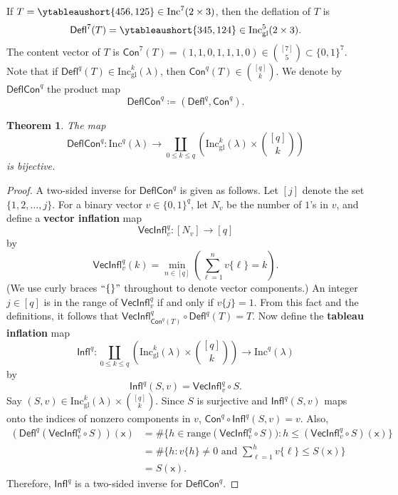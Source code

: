 \documentclass[12pt]{amsart}
\newcommand{\x}{\ensuremath{\mathsf{x}}}
\newtheorem{theorem}{Theorem}[section]
\theoremstyle{definition}
\newenvironment{example}
  {\pushQED{\qed}\renewcommand{\qedsymbol}{$\diamondsuit$}\examplex}
  {\popQED\endexamplex}
\theoremstyle{remark}
\numberwithin{equation}{section}
\newcommand{\inc}{\ensuremath{\mathrm{Inc}}}
\newcommand{\incgl}{\inc_{\mathrm{gl}}}
\newcommand{\deflate}{\ensuremath{\mathsf{Defl}}}
\newcommand{\inflate}{\ensuremath{\mathsf{VecInfl}}}
\newcommand{\tinflate}{\ensuremath{\mathsf{Infl}}}
\newcommand{\content}{\ensuremath{\mathsf{Con}}}
\newcommand{\compress}{\ensuremath{\mathsf{DeflCon}}}
\begin{document}
\begin{example}\label{ex:deflate}
If $T = \ytableaushort{456,125} \in \inc^7(2 \times 3)$, then the deflation of $T$ is \[\deflate^7(T) = \ytableaushort{345,124} \in \incgl^5(2 \times 3).\] The content vector of $T$ is $\content^7(T) = (1,1,0,1,1,1,0) \in \binom{[7]}{5} \subset \{0,1\}^7$.
\end{example}
Note that if $\deflate^q(T) \in \incgl^k(\lambda)$, then $\content^q(T) \in \binom{[q]}{k}$. We denote by $\compress^q$ the product map
\[
\compress^q \coloneqq (\deflate^q,\content^q).
\] 
\begin{theorem}\label{thm:compressbijective} The map 
\[
\compress^q : \inc^q(\lambda) \to \coprod_{0 \leq k \leq q} \left( \incgl^k(\lambda) \times \binom{[q]}{k} \right)
\]
 is bijective.
\end{theorem}
\begin{proof}
A two-sided inverse for $\compress^q$ is given as follows. Let $[j]$ denote the set $\{1, 2, \dots, j\}$.
For a binary vector $v \in \{0,1\}^{q}$, let $N_v$ be the number of $1$'s in $v$, and define a {\bf vector inflation} map \[\inflate^q_v : [N_v] \to [q]\] by
\[ \inflate^q_v(k) = \min_{n \in [q]} \left( \sum_{\ell = 1}^n v\lbrace \ell \rbrace = k \right).\] (We use curly braces $``\{\}"$ throughout to denote vector components.) An integer $j \in [q]$ is in the range of $\inflate^q_v$ if and only if $v\lbrace j \rbrace = 1$. From this fact and the definitions, it follows that $\inflate^q_{\content^q(T)} \circ \deflate^q(T) = T$. Now define the {\bf tableau inflation} map 
\[
\tinflate^q : \coprod_{0 \leq k \leq q} \left( \incgl^k(\lambda) \times \binom{[q]}{k} \right) \to \inc^q(\lambda)
\] 
by 
\[
\tinflate^q(S,v) = \inflate^q_v \circ S.
\]
Say $(S,v) \in \incgl^k(\lambda) \times \binom{[q]}{k}$. Since $S$ is surjective and $\tinflate^q(S,v)$ maps onto the indices of nonzero components in $v$, $\content^q \circ \tinflate^q(S,v) = v$.  Also,
\begin{align*}
 (\deflate^q(\inflate^q_v \circ S))(\x) &= \# \{ h \in \mathrm{range}(\inflate^q_v \circ S)): h \leq (\inflate^q_v \circ S)(\x) \} \\  
 &= \# \{ h: v\{h\} \neq 0 \text{ and } \sum_{\ell = 1}^h v\{\ell\} \leq S(\x)  \} \\
 &= S(\x).
\end{align*}
Therefore, $\tinflate^q$ is a two-sided inverse for $\compress^q$.
\end{proof} 
\end{document}
